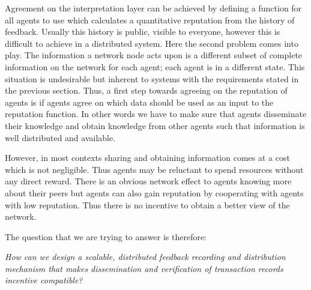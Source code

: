 Agreement on the interpretation layer can be achieved by defining a function for all agents to use
which calculates a quantitative reputation from the history of feedback. Usually this history is 
public, visible to everyone, however this is difficult to achieve in a distributed system. Here the
second problem comes into play. The information a network node acts upon 
is a different subset of complete information on the network for each agent; each agent is 
in a different state. This situation is undesirable but inherent to systems with the requirements 
stated in the previous section. Thus, a first step towards agreeing on the reputation of agents is 
if agents agree on which data should be used as an input to the reputation function. In 
other words we have to make sure that agents disseminate their knowledge and obtain knowledge from 
other agents such that information is well distributed and available.

However, in most contexts sharing and obtaining information comes at a cost which is not negligible.
Thus agents may be reluctant to spend resources without any direct reward. There is an obvious 
network effect to agents knowing more about their peers but agents can also gain reputation by 
cooperating with agents with low reputation. Thus there is no incentive to obtain a better view of
the network.

The question that we are trying to answer is therefore:
\begin{center}
    \textit{How can we design a scalable, distributed feedback recording and distribution mechanism
    that makes dissemination and verification of transaction records incentive compatible?}
\end{center}

